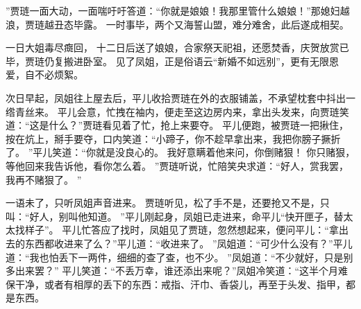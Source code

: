 ”贾琏一面大动，一面喘吁吁答道：“你就是娘娘！我那里管什么娘娘！”那媳妇越浪，贾琏越丑态毕露。
一时事毕，两个又海誓山盟，难分难舍，此后遂成相契。
\par
一日大姐毒尽癍回，
十二日后送了娘娘，合家祭天祀祖，还愿焚香，庆贺放赏已毕，贾琏仍复搬进卧室。
见了凤姐，正是俗语云“新婚不如远别”，更有无限恩爱，自不必烦絮。
\par
次日早起，凤姐往上屋去后，平儿收拾贾琏在外的衣服铺盖，不承望枕套中抖出一绺青丝来。
平儿会意，忙拽在袖内，便走至这边房内来，拿出头发来，向贾琏笑道：“这是什么？”贾琏看见着了忙，抢上来要夺。
平儿便跑，被贾琏一把揪住，按在炕上，掰手要夺，口内笑道：“小蹄子，你不趁早拿出来，我把你膀子撅折了。
”平儿笑道：“你就是没良心的。
我好意瞒着他来问，你倒赌狠！
你只赌狠，等他回来我告诉他，看你怎么着。
”贾琏听说，忙陪笑央求道：“好人，赏我罢，我再不赌狠了。
”\par
一语未了，只听凤姐声音进来。
贾琏听见，松了手不是，还要抢又不是，只叫：“好人，别叫他知道。
”平儿刚起身，凤姐已走进来，命平儿“快开匣子，替太太找样子”。
平儿忙答应了找时，凤姐见了贾琏，忽然想起来，便问平儿：“拿出去的东西都收进来了么？”平儿道：“收进来了。
”凤姐道：“可少什么没有？”平儿道：“我也怕丢下一两件，细细的查了查，也不少。
”凤姐道：“不少就好，只是别多出来罢？” 平儿笑道：“不丢万幸，谁还添出来呢？”凤姐冷笑道：“这半个月难保干净，或者有相厚的丢下的东西：戒指、汗巾、香袋儿，再至于头发、指甲，都是东西。
